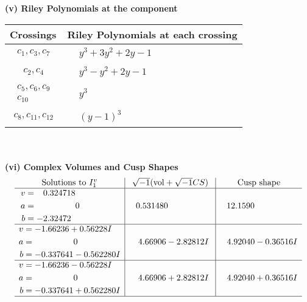 \documentclass[1p]{elsarticle_modified}
\theoremstyle{definition}
\newcommand{\I}{\sqrt{-1}}
\begin{document}
\newpage\renewcommand{\arraystretch}{1}
\flushleft \textbf{(v) Riley Polynomials at the component}\newline \\
\begin{tabular}{m{50pt}|m{274pt}}
Crossings & \hspace{64pt}Riley Polynomials at each crossing \\
\hline $$\begin{aligned}c_{1},c_{3},c_{7}\end{aligned}$$&$\begin{aligned}
&y^3+3 y^2+2 y-1
\end{aligned}$\\
\hline $$\begin{aligned}c_{2},c_{4}\end{aligned}$$&$\begin{aligned}
&y^3- y^2+2 y-1
\end{aligned}$\\
\hline $$\begin{aligned}c_{5},c_{6},c_{9}\\c_{10}\end{aligned}$$&$\begin{aligned}
&y^3
\end{aligned}$\\
\hline $$\begin{aligned}c_{8},c_{11},c_{12}\end{aligned}$$&$\begin{aligned}
&(y-1)^3
\end{aligned}$\\
\hline
\end{tabular}\\~\\
\newpage\flushleft \textbf{(vi) Complex Volumes and Cusp Shapes}
$$\begin{array}{c|c|c}  
\text{Solutions to }I^v_{1}& \I (\text{vol} + \sqrt{-1}CS) & \text{Cusp shape}\\
 \hline 
\begin{aligned}
v &= \phantom{-}0.324718\phantom{ +0.000000I} \\
a &= \phantom{-0.000000 } 0 \\
b &= -2.32472\phantom{ +0.000000I}\end{aligned}
 & \phantom{-}0.531480\phantom{ +0.000000I} & \phantom{-}12.1590\phantom{ +0.000000I} \\ \hline\begin{aligned}
v &= -1.66236 + 0.56228 I \\
a &= \phantom{-0.000000 } 0 \\
b &= -0.337641 - 0.562280 I\end{aligned}
 & \phantom{-}4.66906 - 2.82812 I & \phantom{-}4.92040 - 0.36516 I \\ \hline\begin{aligned}
v &= -1.66236 - 0.56228 I \\
a &= \phantom{-0.000000 } 0 \\
b &= -0.337641 + 0.562280 I\end{aligned}
 & \phantom{-}4.66906 + 2.82812 I & \phantom{-}4.92040 + 0.36516 I\\
 \hline 
 \end{array}$$\newpage
\end{document}

